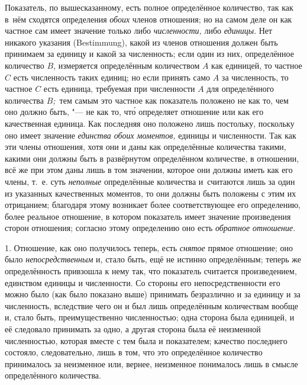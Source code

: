 Показатель, по вышесказанному, есть полное определённое количество, так как
в~нём сходятся определения {\em обоих} членов отношения; но на самом деле он
как частное сам имеет значение только либо {\em численности,} либо
{\em единицы}. Нет никакого указания (Bestimmung), какой из членов отношения
должен быть принимаем за единицу и какой за численность; если один из них,
определённое количество $B$, измеряется определённым количеством $A$ как
единицей, то частное $C$ есть численность таких единиц; но если принять само
$A$ за численность, то частное $C$ есть единица, требуемая при численности $A$
для определённого количества $B${\em ;\,} тем самым это частное как показатель
положено не как то, чем оно должно быть, "--- не как то, чт\'{о} определяет
отношение или как его качественная единица. Как последняя оно положено лишь
постольку, поскольку оно имеет значение {\em единства обоих моментов,} единицы
и численности. Так как эти члены отношения, хотя они и даны как определённые
количества такими, какими они должны быть в развёрнутом определённом
количестве, в отношении, всё же при этом даны лишь в том значении, которое они
должны иметь как его члены, т.~е. суть {\em неполные} определённые количества
и~считаются лишь за один из указанных качественных моментов, то они должны быть
положены с этим их отрицанием; благодаря этому возникает более соответствующее
его определению, более реальное отношение, в котором показатель имеет значение
произведения сторон отношения; согласно этому определению оно есть
{\em обратное отношение}.


1. Отношение, как оно получилось теперь, есть {\em снятое} прямое отношение;
оно было {\em непосредственным} и, стало быть, ещё не истинно определённым;
теперь же определённость привзошла к нему так, что показатель считается
произведением, единством единицы и численности. Со стороны его
непосредственности его можно было (как было показано выше) принимать
безразлично и за единицу и за численность, вследствие чего он и был лишь
определённым количествам вообще и, стало быть, преимущественно численностью;
одна сторона была единицей, и её следовало принимать за одно, а другая сторона
была её неизменной численностью, которая вместе с тем была и показателем;
качество последнего состояло, следовательно, лишь в том, что это определённое
количество принималось за неизменное или, вернее, неизменное понималось лишь в
смысле определённого количества.

